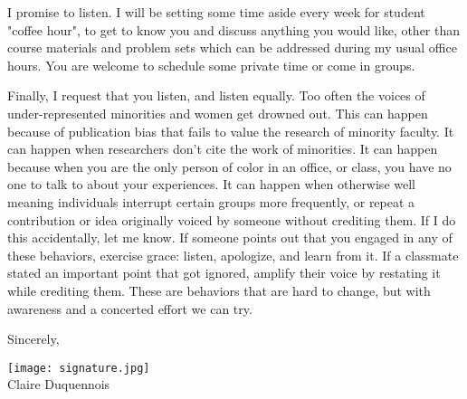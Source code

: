 \documentclass[a4paper, 10pt]{article}
\begin{document}
I promise to listen. I will be setting some time aside every week for student "coffee hour", to get to know you and discuss anything you would like, other than course materials and problem sets which can be addressed during my usual office hours. You are welcome to schedule some private time or come in groups. 

Finally, I request that you listen, and listen equally. Too often the voices of under-represented minorities and women get drowned out. This can happen because of publication bias that fails to value the research of minority faculty. It can happen when researchers don't cite the work of minorities.  It can happen because when you are the only person of color in an office, or class, you have no one to talk to about your experiences. It can happen when otherwise well meaning individuals interrupt certain groups more frequently, or repeat a contribution or idea originally voiced by someone without crediting them. If I do this accidentally, let me know. If someone points out that you engaged in any of these behaviors, exercise grace: listen, apologize, and learn from it.  If a classmate stated an important point that got ignored, amplify their voice by restating it while crediting them. These are behaviors that are hard to change, but with awareness and a concerted effort we can try. 
\vspace{3mm}

\noindent Sincerely, 

\texttt{[image: signature.jpg]} \\
Claire Duquennois
\end{document}
